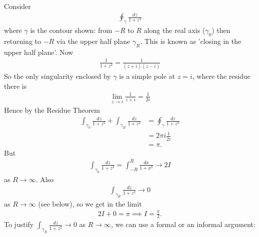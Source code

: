 \documentclass[a4paper]{article}
\begin{document}
Consider
\begin{equation*}
\begin{aligned}
\oint_\gamma \frac{dz}{1+z^2}
\end{aligned}
\end{equation*}
where $\gamma$ is the contour shown: from $-R$ to $R$ along the real axis ($\gamma_0$) then returning to $-R$ via the upper half plane $\gamma_R$. This is known as 'closing in the upper half plane'. Now
\begin{equation*}
\begin{aligned}
\frac{1}{1+z^2} = \frac{1}{(z+i)(z-i)}
\end{aligned}
\end{equation*}
So the only singularity enclosed by $\gamma$ is a simple pole at $z=i$, where the residue there is
\begin{equation*}
\begin{aligned}
\lim_{z\to i} \frac{1}{z+i} = \frac{1}{2i}
\end{aligned}
\end{equation*}
Hence by the Residue Theorem
\begin{equation*}
\begin{aligned}
\int_{\gamma_0} \frac{dz}{1+z^2} + \int_{\gamma_R} \frac{dz}{1+z^2} &= \oint_\gamma \frac{dz}{1+z^2}\\
&= 2\pi i \frac{1}{2i}\\
&= \pi.
\end{aligned}
\end{equation*}
But 
\begin{equation*}
\begin{aligned}
\int_{\gamma_0} \frac{dz}{1+z^2} = \int_{-R}^R \frac{dx}{1+x^2} \to 2I
\end{aligned}
\end{equation*}
as $R \to \infty$. Also
\begin{equation*}
\begin{aligned}
\int_{\gamma_R} \frac{dz}{1+z^2} \to 0
\end{aligned}
\end{equation*}
as $R \to \infty$ (see below), so we get in the limit
\begin{equation*}
\begin{aligned}
2I + 0 = \pi \implies I = \frac{\pi}{2}.
\end{aligned}
\end{equation*}
To justify $\int_{\gamma_R} \frac{dz}{1+z^2} \to 0$ as $R \to \infty$, we can use a formal or an informal argument:\\
\end{document}
